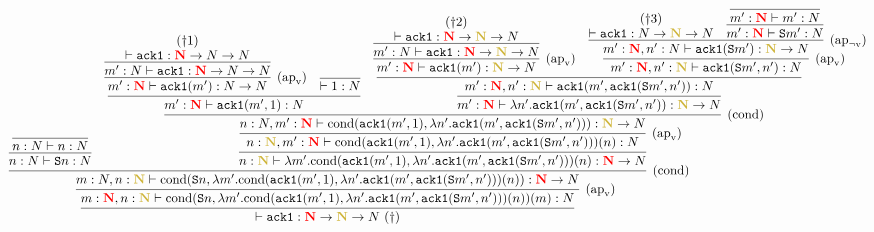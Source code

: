 \documentclass{article}
\newcommand{\bfColor}[2]{{\bf \color{#1}{#2}}}
\newcommand{\Rapv}{\hbox{$(\text{ap}_{\text{v}})$}}
\newcommand{\RapNv}{\hbox{$(\text{ap}_{\lnot\text{v}})$}}
\newcommand{\Rcond}{\hbox{$(\text{cond})$}}
\newcommand{\AckA}{{\tt ack1}}
\newcommand{\Cond}[2]{\text{cond}(#1,#2)}
\newcommand{\Suc}[1]{{\tt S}#1}
\newcommand{\N}{N}
\newcommand{\gN}{\bfColor{oldgold}{N}}
\newcommand{\rN}{\bfColor{red}{N}}
\begin{document}
{\scriptsize
  \hspace{-3cm}
  $\infer{
    \vdash \AckA:\rN\to\gN\to\N\ (\dagger)
  }{
    \infer[\Rapv]{
      m:\rN, n:\gN \vdash \Cond{\Suc{n}}{\lambda m'.\Cond{\AckA(m',1)}{\lambda n'.\AckA(m',\AckA(\Suc{m'},n'))}(n)}(m): \N
    }{
      \infer[\Rcond]{
        m:\N, n:\gN \vdash \Cond{\Suc{n}}{\lambda m'.\Cond{\AckA(m',1)}{\lambda n'.\AckA(m',\AckA(\Suc{m'},n'))}(n)}: \rN\to\N
      }{
        \infer{
          n:\N \vdash \Suc{n}: \N
        }{
          \infer{
            n:\N \vdash n: \N
          }{}
        }
        &
        \infer{
          n:\gN \vdash \lambda m'.\Cond{\AckA(m',1)}{\lambda n'.\AckA(m',\AckA(\Suc{m'},n'))}(n): \rN\to\N
        }{
          \infer[\Rapv]{
            n:\gN, m':\rN \vdash \Cond{\AckA(m',1)}{\lambda n'.\AckA(m',\AckA(\Suc{m'},n'))}(n): \N
          }{
            \infer[\Rcond]{
              n:\N, m':\rN \vdash \Cond{\AckA(m',1)}{\lambda n'.\AckA(m',\AckA(\Suc{m'},n'))}: \gN\to\N
            }{
              \infer{
                m':\rN \vdash \AckA(m',1):\N
              }{
                \infer[\Rapv]{
                  m':\rN \vdash \AckA(m'):\N\to\N
                }{
                  \infer{
                    m':\N \vdash \AckA:\rN\to\N\to\N
                  }{
                    \deduce{
                      \vdash \AckA:\rN\to\N\to\N
                    }{(\dagger1)}
                  }
                }
                &
                \infer{
                  \vdash 1:\N
                }{}
              }
              &
              \infer{
                m':\rN \vdash \lambda n'.\AckA(m',\AckA(\Suc{m'},n')): \gN\to\N
              }{
                \infer{
                  m':\rN, n':\gN \vdash \AckA(m',\AckA(\Suc{m'},n')): \N
                }{
                  \infer[\Rapv]{
                    m':\rN \vdash \AckA(m'): \gN\to\N
                  }{
                    \infer{
                      m':\N \vdash \AckA: \rN\to\gN\to\N
                    }{
                      \deduce{
                        \vdash \AckA: \rN\to\gN\to\N
                      }{(\dagger2)}
                    }
                  }
                  &
                  \infer[\Rapv]{
                    m':\rN, n':\gN \vdash \AckA(\Suc{m'},n'): \N
                  }{
                    \infer[\RapNv]{
                      m':\rN, n':\N \vdash \AckA(\Suc{m'}): \gN\to\N
                    }{
                      \deduce{
                        \vdash \AckA:\N\to\gN\to\N
                      }{
                        (\dagger3)
                      }
                      &
                      \infer{
                        m':\rN \vdash \Suc{m'}:\N
                      }{
                        \infer{
                          m':\rN \vdash m':\N
                        }{}
                      }
                    }
                  }
                }
              }
            }
          }
        }
      }
    }
  }$  
}
\end{document}
